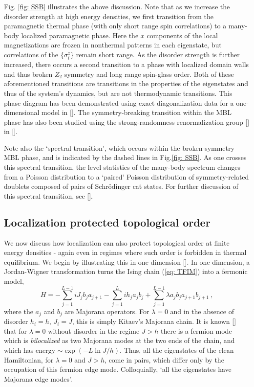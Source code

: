 \documentclass[amsmath,onecolumn, superscriptaddress,preprint,aps]{revtex4}
\renewcommand{\cite}[1]{[\onlinecite{#1}]}
\begin{document}
Fig. \ref{fig: SSB} illustrates the above discussion.  Note that as we increase the disorder strength at high energy densities, we first transition from
the paramagnetic thermal phase (with only short range spin correlations) to a many-body localized paramagnetic phase.  Here the $x$ components of the local
magnetizations are frozen in nonthermal patterns in each eigenstate, but correlations of the $\{\sigma^z_i\}$ remain short range.  As the disorder strength is
further increased,
there occurs a second transition to a phase with localized domain walls and thus broken $Z_2$ symmetry and long range spin-glass order.  Both of these aforementioned transitions are transitions in the properties of the eigenstates and thus of the system's dynamics, but are not thermodynamic transitions.
This phase diagram has been demonstrated using exact diagonalization data for a one-dimensional model in \cite{MBLMore12}.  The symmetry-breaking transition within the MBL phase has also been studied using the strong-randomness renormalization group \cite{Fisher} in \cite{Pekker,Vosk'}.

Note also the `spectral transition', which occurs within the broken-symmetry MBL phase, and is indicated by the dashed lines in Fig.\ref{fig: SSB}.
As one crosses this spectral transition, the level statistics of the many-body spectrum changes from a Poisson distribution to a `paired' Poisson distribution of symmetry-related doublets composed of pairs of Schr\"odinger cat states.  For further discussion of this spectral transition, see \cite{LPQO}.


\subsection{Localization protected topological order}
\label{sec: to}
We now discuss how localization can also protect topological order at finite energy densities - again even in regimes where such order is forbidden in thermal equilibrium.  We begin by illustrating this in one dimension \cite{LPQO}.  In one dimension, a Jordan-Wigner transformation turns the Ising chain (\ref{eq: TFIM}) into a fermonic model,
\begin{equation}
H =  - \sum_{j=1}^{L-1} i J_j b_j a_{j+1} - \sum_{j=1}^L i h_j a_j b_j + \sum_{j=1}^{L-1} \lambda a_j b_j a_{j+1} b_{j+1} ~, \label{eq: to}
\end{equation}
%
where the $a_j$ and $b_j$ are Majorana operators. For $\lambda = 0$ and in the absence of disorder $h_i = h$, $J_i = J$, this is simply Kitaev's Majorana chain.
It is known \cite{Fendley} that for $\lambda = 0$ without disorder in the regime $J>h$ there is a fermion mode which is {\it bilocalized}
as two Majorana modes at the two ends of the
chain, and which has energy $\sim\exp(-L\ln J/h)$.  Thus, all the eigenstates of the clean Hamiltonian, for $\lambda = 0$ and $J>h$, come in pairs,
which differ only by the occupation of this fermion edge mode.  Colloquially, `all the eigenstates have Majorana edge modes'.
\end{document}
